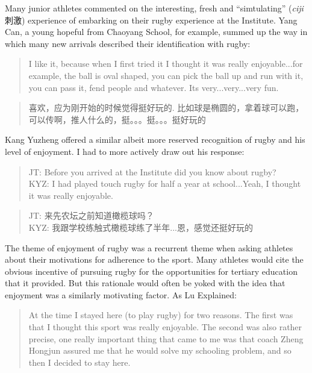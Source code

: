 \begin{CJK}{UTF8}{gbsn}
Many junior athletes commented on the interesting, fresh and ``simtulating'' (\textit{ciji} 刺激) experience of embarking on their rugby experience at the Institute.  Yang Can, a young hopeful from Chaoyang School, for example, summed up the way in which many new arrivals described their identification with rugby:

      \begin{quotation}
        I like it, because when I first tried it I thought it was really enjoyable...for example, the ball is oval shaped, you can pick the ball up and run with it, you can pass it, fend people and whatever.  Its very...very...very fun.
      \end{quotation}

      \begin{quotation}
        喜欢，应为刚开始的时候觉得挺好玩的.	比如球是椭圆的，拿着球可以跑，可以传啊，推人什么的，挺。。。挺。。。挺好玩的 
      \end{quotation}

Kang Yuzheng offered a similar albeit more reserved recognition of rugby and his level of enjoyment.  I had to more actively draw out his response:

      \begin{quotation}
        JT: Before you arrived at the Institute did you know about rugby?\\
        KYZ: I had played touch rugby for half a year at school...Yeah, I thought it was really enjoyable.
      \end{quotation}

      \begin{quotation}
        JT: 来先农坛之前知道橄榄球吗？\\
        KYZ: 我跟学校练触式橄榄球练了半年...恩，感觉还挺好玩的
      \end{quotation}

The theme of enjoyment of rugby was a recurrent theme when asking athletes about their motivations for adherence to the sport.  Many athletes would cite the obvious incentive of pursuing rugby for the opportunities for tertiary education that it provided.  But this rationale would often be yoked with the idea that enjoyment was a similarly motivating factor.  As Lu Explained:

    \begin{quotation}
      At the time I stayed here (to play rugby) for two reasons.  The first was that I thought this sport was really enjoyable. The second was also rather precise, one really important thing that came to me was that coach Zheng Hongjun assured me that he would solve my schooling problem, and so then I decided to stay here.
    \end{quotation}


\end{CJK}
